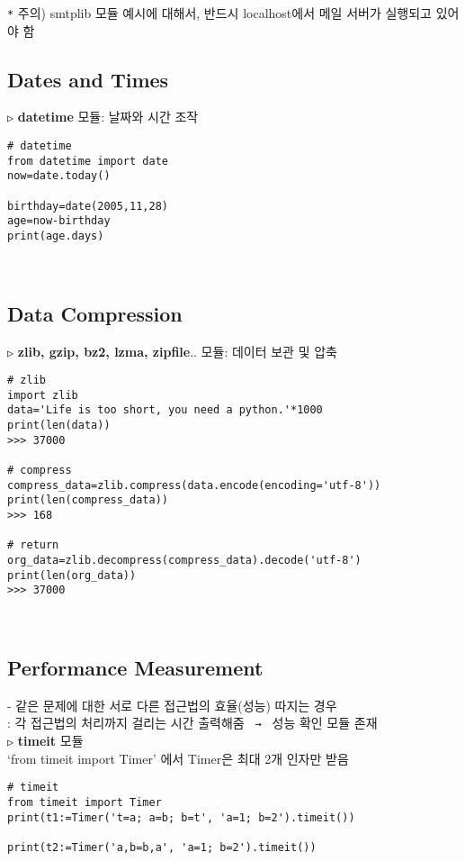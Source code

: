 \documentclass[11pt,a4paper]{article}
\begin{document}
\begin{spacing}{1.5}
\texttt{*} 주의) smtplib 모듈 예시에 대해서, 반드시 localhost에서 메일 서버가 실행되고 있어야 함\\


\subsection{\Large\textbf{Dates and Times}}
\texttt{▷} \textbf{datetime} 모듈: 날짜와 시간 조작
\begin{lstlisting}[label={list:first},caption=datetime]
# datetime
from datetime import date
now=date.today()

birthday=date(2005,11,28)
age=now-birthday
print(age.days)
\end{lstlisting}\\

\subsection{\Large\textbf{Data Compression}}
\texttt{▷} \textbf{zlib, gzip, bz2, lzma, zipfile}.. 모듈: 데이터 보관 및 압축
\begin{lstlisting}[label={list:first}]
# zlib
import zlib
data='Life is too short, you need a python.'*1000
print(len(data))
>>> 37000

# compress
compress_data=zlib.compress(data.encode(encoding='utf-8'))
print(len(compress_data))
>>> 168

# return
org_data=zlib.decompress(compress_data).decode('utf-8')
print(len(org_data))
>>> 37000
\end{lstlisting}\\

\subsection{\Large\textbf{Performance Measurement}}
- 같은 문제에 대한 서로 다른 접근법의 효율(성능) 따지는 경우\\
: 각 접근법의 처리까지 걸리는 시간 출력해줌 \texttt{ → } 성능 확인 모듈 존재\\

\texttt{▷} \textbf{timeit} 모듈\\
`from timeit import Timer' 에서 Timer은 최대 2개 인자만 받음
\begin{lstlisting}[label={list:first}]
# timeit
from timeit import Timer
print(t1:=Timer('t=a; a=b; b=t', 'a=1; b=2').timeit())

print(t2:=Timer('a,b=b,a', 'a=1; b=2').timeit())
\end{lstlisting}\\



\end{spacing}
\end{document}
